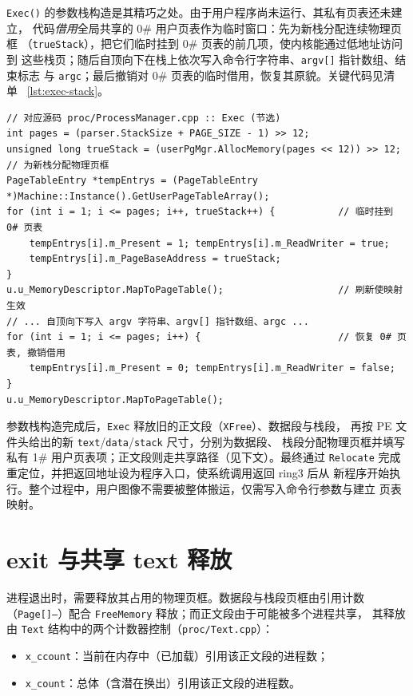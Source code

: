 \texttt{Exec()} 的参数栈构造是其精巧之处。由于用户程序尚未运行、其私有页表还未建立，
代码\emph{借用}全局共享的 0\# 用户页表作为临时窗口：先为新栈分配连续物理页框
（\texttt{trueStack}），把它们临时挂到 0\# 页表的前几项，使内核能通过低地址访问到
这些栈页；随后自顶向下在栈上依次写入命令行字符串、\texttt{argv[]} 指针数组、结束标志
与 \texttt{argc}；最后撤销对 0\# 页表的临时借用，恢复其原貌。关键代码见清单~%
\ref{lst:exec-stack}。

\begin{lstlisting}[caption={exec 借用 0\# 页表构造参数栈},label={lst:exec-stack}]
// 对应源码 proc/ProcessManager.cpp :: Exec (节选)
int pages = (parser.StackSize + PAGE_SIZE - 1) >> 12;
unsigned long trueStack = (userPgMgr.AllocMemory(pages << 12)) >> 12; // 为新栈分配物理页框
PageTableEntry *tempEntrys = (PageTableEntry *)Machine::Instance().GetUserPageTableArray();
for (int i = 1; i <= pages; i++, trueStack++) {           // 临时挂到 0# 页表
    tempEntrys[i].m_Present = 1; tempEntrys[i].m_ReadWriter = true;
    tempEntrys[i].m_PageBaseAddress = trueStack;
}
u.u_MemoryDescriptor.MapToPageTable();                    // 刷新使映射生效
// ... 自顶向下写入 argv 字符串、argv[] 指针数组、argc ...
for (int i = 1; i <= pages; i++) {                        // 恢复 0# 页表, 撤销借用
    tempEntrys[i].m_Present = 0; tempEntrys[i].m_ReadWriter = false;
}
u.u_MemoryDescriptor.MapToPageTable();
\end{lstlisting}

参数栈构造完成后，\texttt{Exec} 释放旧的正文段（\texttt{XFree}）、数据段与栈段，
再按 PE 文件头给出的新 \texttt{text}/\texttt{data}/\texttt{stack} 尺寸，分别为数据段、
栈段分配物理页框并填写私有 1\# 用户页表项；正文段则走共享路径（见下文）。最终通过
\texttt{Relocate} 完成重定位，并把返回地址设为程序入口，使系统调用返回 ring3 后从
新程序开始执行。整个过程中，用户图像不需要被整体搬运，仅需写入命令行参数与建立
页表映射。

\section{exit 与共享 text 释放}
进程退出时，需要释放其占用的物理页框。数据段与栈段页框由引用计数
（\texttt{Page[]--}）配合 \texttt{FreeMemory} 释放；而正文段由于可能被多个进程共享，
其释放由 \texttt{Text} 结构中的两个计数器控制（\texttt{proc/Text.cpp}）：

\begin{itemize}
  \item \texttt{x\_ccount}：当前在内存中（已加载）引用该正文段的进程数；
  \item \texttt{x\_count}：总体（含潜在换出）引用该正文段的进程数。
\end{itemize}

